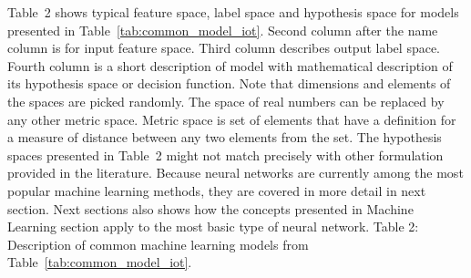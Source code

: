 \documentclass[english, 12pt, a4paper, elec, utf8, online]{aaltothesis}
\begin{document}
Table~2 shows typical feature space, label space and hypothesis space for models presented in Table~\ref{tab:common_model_iot}. Second column after the name column is for input feature space. Third column describes output label space. Fourth column is a short description of model with mathematical description of its hypothesis space or decision function. Note that dimensions and elements of the spaces are picked randomly. The space of real numbers can be replaced by any other metric space. Metric space is set of elements that have a definition for a measure of distance between any two elements from the set. The hypothesis spaces presented in Table~2 might not match precisely with other formulation provided in the literature. Because neural networks are currently among the most popular machine learning methods, they are covered in more detail in next section. Next sections also shows how the concepts presented in Machine Learning section apply to the most basic type of neural network.      
\newpage
Table 2: Description of common machine learning models from Table~\ref{tab:common_model_iot}.
\end{document}
